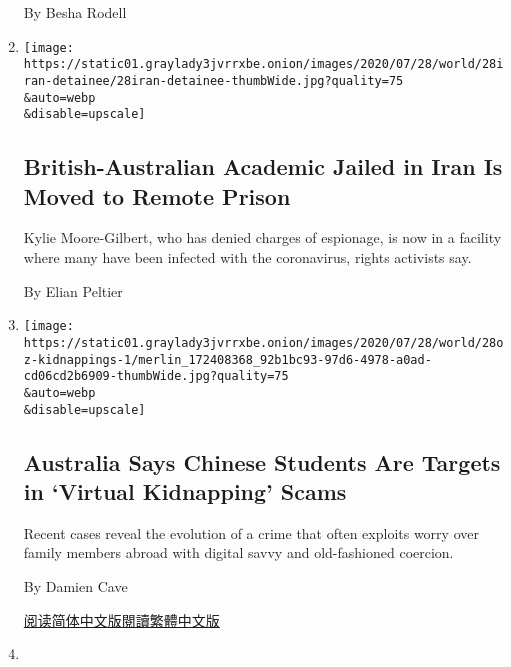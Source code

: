 \begin{enumerate}
  By Besha Rodell
\item
  \href{/2020/07/28/world/europe/british-australian-academic-jail-iran-qarchak.html}{}

  \texttt{[image: https://static01.graylady3jvrrxbe.onion/images/2020/07/28/world/28iran-detainee/28iran-detainee-thumbWide.jpg?quality=75\\\&auto=webp\\\&disable=upscale]}

  \hypertarget{british-australian-academic-jailed-in-iran-is-moved-to-remote-prison}{%
  \subsection{British-Australian Academic Jailed in Iran Is Moved to
  Remote
  Prison}\label{british-australian-academic-jailed-in-iran-is-moved-to-remote-prison}}

  Kylie Moore-Gilbert, who has denied charges of espionage, is now in a
  facility where many have been infected with the coronavirus, rights
  activists say.

  By Elian Peltier
\item
  \href{/2020/07/28/world/australia/chinese-students-virtual-kidnapping.html}{}

  \texttt{[image: https://static01.graylady3jvrrxbe.onion/images/2020/07/28/world/28oz-kidnappings-1/merlin\_172408368\_92b1bc93-97d6-4978-a0ad-cd06cd2b6909-thumbWide.jpg?quality=75\\\&auto=webp\\\&disable=upscale]}

  \hypertarget{australia-says-chinese-students-are-targets-in-virtual-kidnapping-scams}{%
  \subsection{Australia Says Chinese Students Are Targets in `Virtual
  Kidnapping'
  Scams}\label{australia-says-chinese-students-are-targets-in-virtual-kidnapping-scams}}

  Recent cases reveal the evolution of a crime that often exploits worry
  over family members abroad with digital savvy and old-fashioned
  coercion.

  By Damien Cave

  \href{https://cn.nytimes3xbfgragh.onion/asia-pacific/20200729/chinese-students-virtual-kidnapping/}{阅读简体中文版}\href{https://cn.nytimes3xbfgragh.onion/asia-pacific/20200729/chinese-students-virtual-kidnapping/zh-hant/}{閱讀繁體中文版}
\item
  \href{/2020/07/24/world/australia/behrouz-boochani-asylum-new-zealand.html}{}


\end{enumerate}
